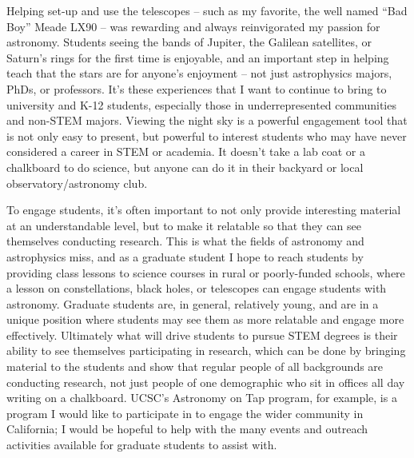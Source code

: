 \documentclass[11pt,letterpaper]{article}
\begin{document}
Helping set-up and use the telescopes -- such as my favorite, the well named “Bad Boy” Meade LX90 -- was rewarding and always reinvigorated my passion for astronomy. Students seeing the bands of Jupiter, the Galilean satellites, or Saturn’s rings for the first time is enjoyable, and an important step in helping teach that the stars are for anyone’s enjoyment -- not just astrophysics majors, PhDs, or professors. It’s these experiences that I want to continue to bring to university and K-12 students, especially those in underrepresented communities and non-STEM majors. Viewing the night sky is a powerful engagement tool that is not only easy to present, but powerful to interest students who may have never considered a career in STEM or academia. It doesn’t take a lab coat or a chalkboard to do science, but anyone can do it in their backyard or local observatory/astronomy club.  

To engage students, it's often important to not only provide interesting material at an understandable level, but to make it relatable so that they can see themselves conducting research. This is what the fields of astronomy and astrophysics miss, and as a graduate student I hope to reach students by providing class lessons to science courses in rural or poorly-funded schools, where a lesson on constellations, black holes, or telescopes can engage students with astronomy. Graduate students are, in general, relatively young, and are in a unique position where students may see them as more relatable and engage more effectively. Ultimately what will drive students to pursue STEM degrees is their ability to see themselves participating in research, which can be done by bringing material to the students and show that regular people of all backgrounds are conducting research, not just people of one demographic who sit in offices all day writing on a chalkboard. UCSC's Astronomy on Tap program, for example, is a program I would like to participate in to engage the wider community in California; I would be hopeful to help with the many events and outreach activities available for graduate students to assist with. 
\end{document}
